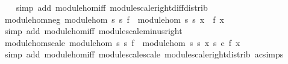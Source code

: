 \begin{isabellebody}
%
\isadelimproof
\ \ %
\endisadelimproof
%
\isatagproof
{}\isamarkupfalse%
\ {\isacharparenleft}{\kern0pt}simp\ add{\isacharcolon}{\kern0pt}\ module{\isacharunderscore}{\kern0pt}hom{\isacharunderscore}{\kern0pt}iff\ module{\isachardot}{\kern0pt}scale{\isacharunderscore}{\kern0pt}right{\isacharunderscore}{\kern0pt}diff{\isacharunderscore}{\kern0pt}distrib{\isacharparenright}{\kern0pt}%
\endisatagproof
{\isafoldproof}%
%
\isadelimproof
\isanewline
%
\endisadelimproof
\isanewline
{}\isamarkupfalse%
\ module{\isacharunderscore}{\kern0pt}hom{\isacharunderscore}{\kern0pt}neg{\isacharcolon}{\kern0pt}\ {\isachardoublequoteopen}module{\isacharunderscore}{\kern0pt}hom\ s{}\ s{}\ f\ {\isasymLongrightarrow}\ module{\isacharunderscore}{\kern0pt}hom\ s{}\ s{}\ {\isacharparenleft}{\kern0pt}{\isasymlambda}x{\isachardot}{\kern0pt}\ {\isacharminus}{\kern0pt}\ f\ x{\isacharparenright}{\kern0pt}{\isachardoublequoteclose}\isanewline
%
\isadelimproof
\ \ %
\endisadelimproof
%
\isatagproof
{}\isamarkupfalse%
\ {\isacharparenleft}{\kern0pt}simp\ add{\isacharcolon}{\kern0pt}\ module{\isacharunderscore}{\kern0pt}hom{\isacharunderscore}{\kern0pt}iff\ module{\isachardot}{\kern0pt}scale{\isacharunderscore}{\kern0pt}minus{\isacharunderscore}{\kern0pt}right{\isacharparenright}{\kern0pt}%
\endisatagproof
{\isafoldproof}%
%
\isadelimproof
\isanewline
%
\endisadelimproof
\isanewline
{}\isamarkupfalse%
\ module{\isacharunderscore}{\kern0pt}hom{\isacharunderscore}{\kern0pt}scale{\isacharcolon}{\kern0pt}\ {\isachardoublequoteopen}module{\isacharunderscore}{\kern0pt}hom\ s{}\ s{}\ f\ {\isasymLongrightarrow}\ module{\isacharunderscore}{\kern0pt}hom\ s{}\ s{}\ {\isacharparenleft}{\kern0pt}{\isasymlambda}x{\isachardot}{\kern0pt}\ s{}\ c\ {\isacharparenleft}{\kern0pt}f\ x{\isacharparenright}{\kern0pt}{\isacharparenright}{\kern0pt}{\isachardoublequoteclose}\isanewline
%
\isadelimproof
\ \ %
\endisadelimproof
%
\isatagproof
{}\isamarkupfalse%
\ {\isacharparenleft}{\kern0pt}simp\ add{\isacharcolon}{\kern0pt}\ module{\isacharunderscore}{\kern0pt}hom{\isacharunderscore}{\kern0pt}iff\ module{\isachardot}{\kern0pt}scale{\isacharunderscore}{\kern0pt}scale\ module{\isachardot}{\kern0pt}scale{\isacharunderscore}{\kern0pt}right{\isacharunderscore}{\kern0pt}distrib\ ac{\isacharunderscore}{\kern0pt}simps{\isacharparenright}{\kern0pt}%
\endisatagproof
{\isafoldproof}%
%
\isadelimproof
\isanewline
%
\endisadelimproof
\isanewline
{}\isamarkupfalse%

\end{isabellebody}
